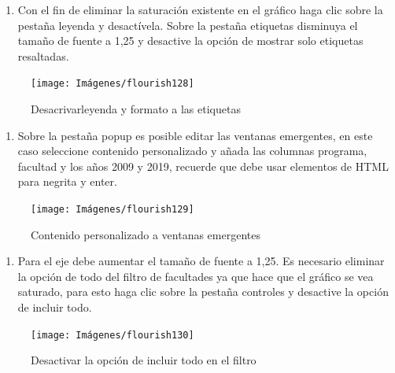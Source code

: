 \documentclass[
]{book}
\providecommand{\tightlist}{%
  \setlength{\itemsep}{0pt}\setlength{\parskip}{0pt}}
\begin{document}
\begin{enumerate}
\def\labelenumi{\arabic{enumi}.}
\setcounter{enumi}{2}
\tightlist
\item
  Con el fin de eliminar la saturación existente en el gráfico haga clic sobre la pestaña leyenda y desactívela. Sobre la pestaña etiquetas disminuya el tamaño de fuente a 1,25 y desactive la opción de mostrar solo etiquetas resaltadas.
\end{enumerate}

\begin{figure}

{\centering \texttt{[image: Imágenes/flourish128]} 

}

\caption{Desacrivarleyenda y formato a las etiquetas}\label{fig:paso3pendienteflourish-fig}
\end{figure}

\begin{enumerate}
\def\labelenumi{\arabic{enumi}.}
\setcounter{enumi}{3}
\tightlist
\item
  Sobre la pestaña popup es posible editar las ventanas emergentes, en este caso seleccione contenido personalizado y añada las columnas programa, facultad y los años 2009 y 2019, recuerde que debe usar elementos de HTML para negrita y enter.
\end{enumerate}

\begin{figure}

{\centering \texttt{[image: Imágenes/flourish129]} 

}

\caption{Contenido personalizado a ventanas emergentes}\label{fig:paso4pendienteflourish-fig}
\end{figure}

\begin{enumerate}
\def\labelenumi{\arabic{enumi}.}
\setcounter{enumi}{4}
\tightlist
\item
  Para el eje debe aumentar el tamaño de fuente a 1,25. Es necesario eliminar la opción de todo del filtro de facultades ya que hace que el gráfico se vea saturado, para esto haga clic sobre la pestaña controles y desactive la opción de incluir todo.
\end{enumerate}

\begin{figure}

{\centering \texttt{[image: Imágenes/flourish130]} 

}

\caption{Desactivar la opción de incluir todo en el filtro}\label{fig:paso5pendienteflourish-fig}
\end{figure}
\end{document}
